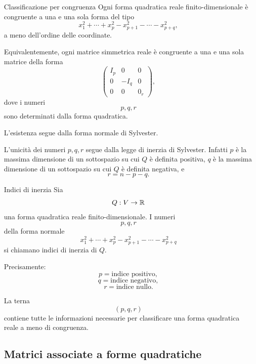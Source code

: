 \documentclass[a4paper]{article}
\begin{document}
\begin{snippetcorollary}{Classificazione per congruenza}
    Ogni forma quadratica reale finito-dimensionale è congruente a una e una sola forma del tipo
    \[
        x_1^2+\cdots+x_p^2
        -
        x_{p+1}^2-\cdots-x_{p+q}^2,
    \]
    a meno dell'ordine delle coordinate.

    Equivalentemente, ogni matrice simmetrica reale è congruente a una e una sola matrice della forma
    \[
        \begin{pmatrix}
            I_p & 0 & 0\\
            0 & -I_q & 0\\
            0 & 0 & 0_r
        \end{pmatrix},
    \]
    dove i numeri
    \[
        p,q,r
    \]
    sono determinati dalla forma quadratica.
\end{snippetcorollary}

\begin{snippetproof}{}
    L'esistenza segue dalla forma normale di Sylvester.

    L'unicità dei numeri \(p,q,r\) segue dalla legge di inerzia di Sylvester. Infatti \(p\) è la massima dimensione di un sottospazio su cui \(Q\) è definita positiva, \(q\) è la massima dimensione di un sottospazio su cui \(Q\) è definita negativa, e
    \[
        r=n-p-q.
    \]
\end{snippetproof}

\begin{snippetdefinition}{Indici di inerzia}
    Sia
    \[
        Q:V\to\mathbb{R}
    \]
    una forma quadratica reale finito-dimensionale. I numeri
    \[
        p,q,r
    \]
    della forma normale
    \[
        x_1^2+\cdots+x_p^2
        -
        x_{p+1}^2-\cdots-x_{p+q}^2
    \]
    si chiamano indici di inerzia di \(Q\).

    Precisamente:
    \[
        p=\text{indice positivo},
    \]
    \[
        q=\text{indice negativo},
    \]
    \[
        r=\text{indice nullo}.
    \]
\end{snippetdefinition}

La terna
\[
    (p,q,r)
\]
contiene tutte le informazioni necessarie per classificare una forma quadratica reale a meno di congruenza.

\subsection{Matrici associate a forme quadratiche}
\end{document}
